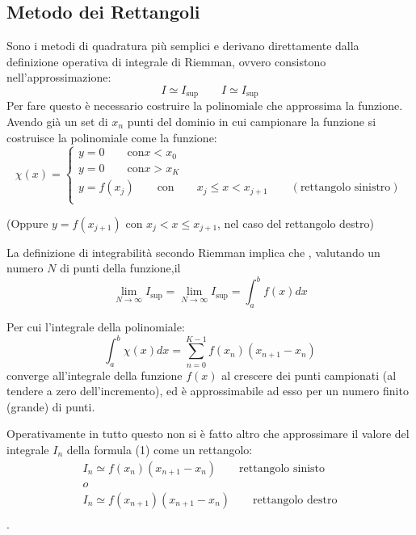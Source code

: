 \documentclass{article}
\begin{document}
\subsection{Metodo dei Rettangoli}

Sono i metodi di quadratura più semplici e derivano direttamente dalla definizione operativa di integrale di Riemman, ovvero consistono nell'approssimazione:
$$I \simeq I_{\textrm{sup}} \qquad I \simeq I_{\textrm{sup}} $$
Per fare questo è necessario costruire la polinomiale che approssima la funzione.
Avendo già un set di ${x_{n}}$ punti del dominio in cui campionare la funzione si costruisce la polinomiale come la funzione:
\begin{equation}
	\chi(x) = \left\{ 
			\begin{array}{l}
 			y=0 \qquad \textrm{con} x < x_{0}\\
 			y=0 \qquad \textrm{con} x > x_{K} \\
			y= f(x_{j}) \qquad \textrm{con} \qquad x_{j} \leq x < x_{j+1} \qquad (\textrm{rettangolo sinistro}) \\
  			\end{array} \right.
	\end{equation}

(Oppure $ y= f(x_{j+1})$ con $ x_{j} < x \leq x_{j+1}$, nel caso del rettangolo destro)

La definizione di integrabilità secondo Riemman implica che , valutando un numero $N$ di punti della funzione,il
$$  \lim_{N \rightarrow \infty}I_{\textrm{sup}}=\lim_{N \rightarrow \infty}I_{\textrm{sup}}=\int_{a}^{b}f(x)dx$$

Per cui l'integrale della polinomiale:
$$\int_{a}^{b}\chi(x)dx = \sum_{n=0}^{K-1}f(x_{n})(x_{n+1}-x_{n})$$
converge all'integrale della funzione $f(x)$ al crescere dei punti campionati (al tendere a zero dell'incremento), ed è approssimabile ad esso per un numero finito (grande) di punti.

Operativamente in tutto questo non si è fatto altro che approssimare il valore del integrale $I_{n}$ della formula (1) come un rettangolo:
\begin{equation}
			\begin{array}{l}
 			I_{n} \simeq  f(x_{n})(x_{n+1}-x_{n}) \qquad \textrm{rettangolo sinisto}\\
				o\\
 			I_{n} \simeq  f(x_{n+1})(x_{n+1}-x_{n}) \qquad \textrm{rettangolo destro}\\
			\end{array} 
	\end{equation}.
\end{document}
